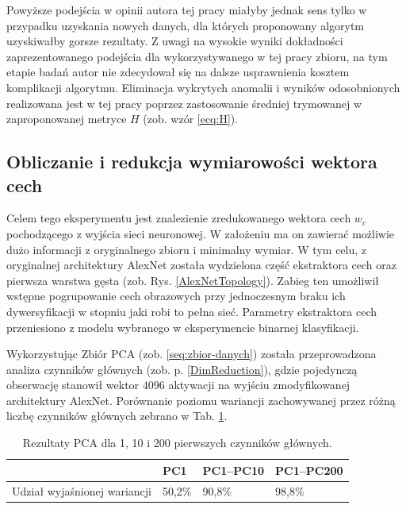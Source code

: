 Powyższe podejścia w opinii autora tej pracy miałyby jednak sens tylko w przypadku uzyskania nowych danych, dla których proponowany algorytm uzyskiwałby gorsze rezultaty. Z uwagi na wysokie wyniki dokładności zaprezentowanego podejścia dla wykorzystywanego w tej pracy zbioru, na tym etapie badań autor nie zdecydował się na dalsze usprawnienia kosztem komplikacji algorytmu. Eliminacja wykrytych anomalii i wyników odosobnionych realizowana jest w tej pracy poprzez zastosowanie średniej trymowanej w zaproponowanej metryce $H$ (zob. wzór \ref{ecq:H}).

\subsection{Obliczanie i redukcja wymiarowości wektora cech}

Celem tego eksperymentu jest znalezienie zredukowanego wektora cech $w_c$ pochodzącego z wyjścia sieci neuronowej. W założeniu ma on zawierać możliwie dużo informacji z oryginalnego zbioru i minimalny wymiar. W tym celu, z oryginalnej architektury AlexNet została wydzielona część ekstraktora cech oraz pierwsza warstwa gęsta (zob. Rys. \ref{AlexNetTopology}). Zabieg ten umożliwił wstępne pogrupowanie cech obrazowych przy jednoczesnym braku ich dywersyfikacji w stopniu jaki robi to pełna sieć. Parametry ekstraktora cech przeniesiono z modelu wybranego w eksperymencie binarnej klasyfikacji. 

Wykorzystując Zbiór PCA (zob. \ref{seq:zbior-danych}) została przeprowadzona analiza czynników głównych (zob. p. \ref{DimReduction}), gdzie pojedynczą obserwację stanowił wektor 4096 aktywacji na wyjściu zmodyfikowanej architektury AlexNet. Porównanie poziomu wariancji zachowywanej przez różną liczbę czynników głównych zebrano w Tab. \ref{PCA-results}.
\vspace{10px}
\renewcommand{\arraystretch}{1.2}
\begin{table}[h!]
 \setlength{\tabcolsep}{12pt}
 \centering
 \caption{Rezultaty PCA dla 1, 10 i 200 pierwszych czynników głównych.}
 \label{PCA-results}
 \begin{tabular}{l|l|l|l}
 
 & PC1 & PC1--PC10 & PC1--PC200 \\ \hline \hline
 Udział wyjaśnionej wariancji & 50,2\% & 90,8\%   & 98,8\% \\ \hline 
 \end{tabular}
 \end{table}
\renewcommand{\arraystretch}{1}


